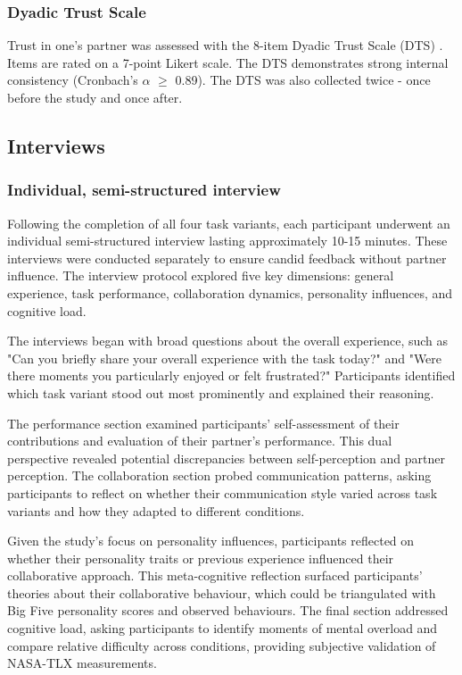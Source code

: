 \subsubsection{Dyadic Trust Scale}\label{subsec:dyadic_trust}
Trust in one's partner was assessed with the 8-item Dyadic Trust Scale (DTS) \cite{larzelere1980dyadic}. Items are rated on a 7-point Likert scale. The DTS demonstrates strong internal consistency (Cronbach's $\alpha$ $\geq$ 0.89)\cite{larzelere1980dyadic, ccetinkaya2008validity}. The DTS was also collected twice - once before the study and once after.

\subsection{Interviews}\label{subsec:interviews}
\subsubsection{Individual, semi-structured interview}\label{subsec:individual-semi-structured-interview}
Following the completion of all four task variants, each participant underwent an individual semi-structured interview lasting approximately 10-15 minutes. These interviews were conducted separately to ensure candid feedback without partner influence. The interview protocol explored five key dimensions: general experience, task performance, collaboration dynamics, personality influences, and cognitive load.

The interviews began with broad questions about the overall experience, such as "Can you briefly share your overall experience with the task today?" and "Were there moments you particularly enjoyed or felt frustrated?" Participants identified which task variant stood out most prominently and explained their reasoning.

The performance section examined participants' self-assessment of their contributions and evaluation of their partner's performance. This dual perspective revealed potential discrepancies between self-perception and partner perception. The collaboration section probed communication patterns, asking participants to reflect on whether their communication style varied across task variants and how they adapted to different conditions.

Given the study's focus on personality influences, participants reflected on whether their personality traits or previous experience influenced their collaborative approach. This meta-cognitive reflection surfaced participants' theories about their collaborative behaviour, which could be triangulated with Big Five personality scores and observed behaviours. The final section addressed cognitive load, asking participants to identify moments of mental overload and compare relative difficulty across conditions, providing subjective validation of NASA-TLX measurements.

